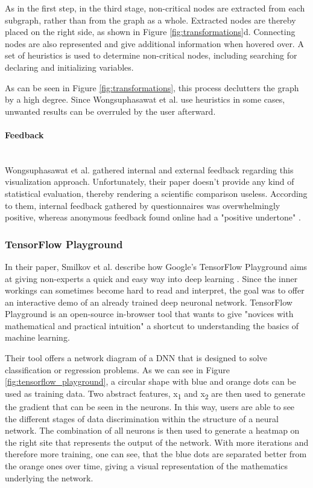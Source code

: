 \documentclass{acmsiggraph}               %
\newcommand{\paragraphbr}[1]{\paragraph{#1}\mbox{}\\}
\begin{document}
As in the first step, in the third stage, non-critical nodes are extracted from each subgraph, rather than from the graph as a whole. Extracted nodes are thereby placed on the right side, as shown in Figure \ref{fig:transformations}d. Connecting nodes are also represented and give additional information when hovered over. A set of heuristics is used to determine non-critical nodes, including searching for declaring and initializing variables.

As can be seen in Figure \ref{fig:transformations}, this process declutters the graph by a high degree. Since Wongsuphasawat et al. use heuristics in some cases, unwanted results can be overruled by the user afterward.

\paragraphbr{Feedback}

Wongsuphasawat et al. gathered internal and external feedback regarding this visualization approach. Unfortunately, their paper doesn't provide any kind of statistical evaluation, thereby rendering a scientific comparison useless. According to them, internal feedback gathered by questionnaires was overwhelmingly positive, whereas anonymous feedback found online had a "positive undertone" \cite[p.~9]{Wongsuphasawat2018}.

\subsubsection{TensorFlow Playground}

In their paper, Smilkov et al. describe how Google's TensorFlow Playground aims at giving non-experts a quick and easy way into deep learning \cite{Smilkov2017}. Since the inner workings can sometimes become hard to read and interpret, the goal was to offer an interactive demo of an already trained deep neuronal network. TensorFlow Playground is an open-source in-browser tool that wants to give "novices with mathematical and practical intuition" \cite[p.~1]{Smilkov2017} a shortcut to understanding the basics of machine learning.

Their tool offers a network diagram of a DNN that is designed to solve classification or regression problems. As we can see in Figure \ref{fig:tensorflow_playground}, a circular shape with blue and orange dots can be used as training data. Two abstract features, x\textsubscript{1} and x\textsubscript{2} are then used to generate the gradient that can be seen in the neurons. In this way, users are able to see the different stages of data discrimination within the structure of a neural network. The combination of all neurons is then used to generate a heatmap on the right site that represents the output of the network. With more iterations and therefore more training, one can see, that the blue dots are separated better from the orange ones over time, giving a visual representation of the mathematics underlying the network.
\end{document}
